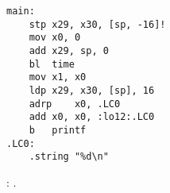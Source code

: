 \begin{lstlisting}[caption=\Optimizing GCC 4.9 (ARM64)]
main:
	stp	x29, x30, [sp, -16]!
	mov	x0, 0
	add	x29, sp, 0
	bl	time
	mov	x1, x0
	ldp	x29, x30, [sp], 16
	adrp	x0, .LC0
	add	x0, x0, :lo12:.LC0
	b	printf
.LC0:
	.string	"%d\n"
\end{lstlisting}



\Answer{}: .
